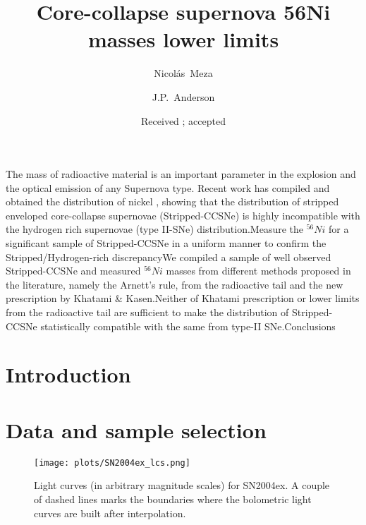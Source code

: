 \documentclass[onecolumn]{aa} %
\begin{document}
 


   \title{Core-collapse supernova 56Ni masses lower limits}


 \author{Nicol\'as~Meza \and J.P.~Anderson }


   \date{Received ; accepted }

 
  \abstract
   {The mass of radioactive material is an important parameter in the explosion and the optical emission of any Supernova type. Recent work has compiled and obtained the distribution of nickel , showing that the distribution of stripped enveloped core-collapse supernovae (Stripped-CCSNe) is highly incompatible with the hydrogen rich supernovae (type II-SNe) distribution.}{Measure the $^{56} Ni$ for a significant sample of Stripped-CCSNe in a uniform manner to confirm the Stripped/Hydrogen-rich discrepancy}{We compiled a sample of well observed Stripped-CCSNe and measured $^{56} Ni$ masses from different methods proposed in the literature, namely the Arnett's rule, from the radioactive tail and the new prescription by Khatami \& Kasen.}{Neither of Khatami prescription or lower limits from the radioactive tail are sufficient to make the distribution of Stripped-CCSNe statistically compatible with the same from type-II SNe.}{Conclusions}


   \maketitle
%

\section{Introduction}

\section{Data and sample selection} 
\label{sec:data}

\begin{figure}[ht!]
 \centering
\texttt{[image: plots/SN2004ex\_lcs.png]}
\caption{Light curves (in arbitrary magnitude scales) for SN2004ex. A couple of dashed lines marks the boundaries where the bolometric light curves are built after interpolation.\label{fig:lc_example}}
\end{figure}
\end{document}
